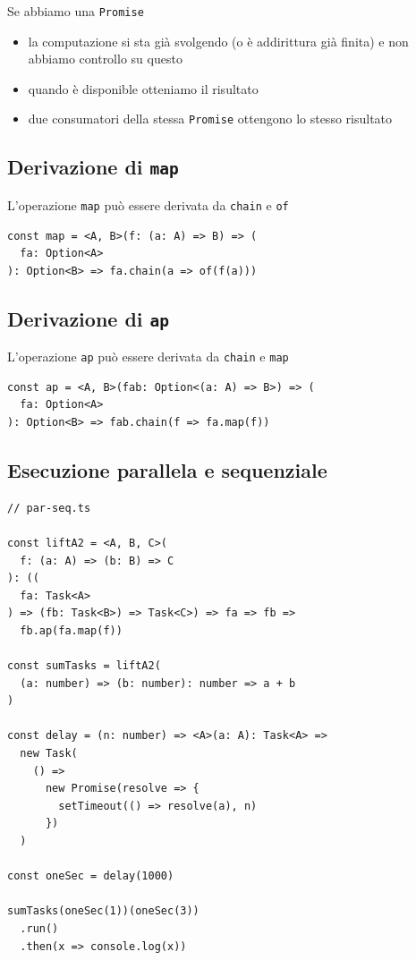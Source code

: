 \documentclass[12pt]{article}
\begin{document}
Se abbiamo una \texttt{Promise}

\begin{itemize}
  \item la computazione si sta già svolgendo (o è addirittura già finita) e non abbiamo controllo su questo
  \item quando è disponible otteniamo il risultato
  \item due consumatori della stessa \texttt{Promise} ottengono lo stesso risultato
\end{itemize}

\subsection{Derivazione di \texttt{map}}

L'operazione \texttt{map} può essere derivata da \texttt{chain} e \texttt{of}

\begin{verbatim}
const map = <A, B>(f: (a: A) => B) => (
  fa: Option<A>
): Option<B> => fa.chain(a => of(f(a)))
\end{verbatim}

\subsection{Derivazione di \texttt{ap}}

L'operazione \texttt{ap} può essere derivata da \texttt{chain} e \texttt{map}

\begin{verbatim}
const ap = <A, B>(fab: Option<(a: A) => B>) => (
  fa: Option<A>
): Option<B> => fab.chain(f => fa.map(f))
\end{verbatim}

\subsection{Esecuzione parallela e sequenziale}

\begin{verbatim}
// par-seq.ts

const liftA2 = <A, B, C>(
  f: (a: A) => (b: B) => C
): ((
  fa: Task<A>
) => (fb: Task<B>) => Task<C>) => fa => fb =>
  fb.ap(fa.map(f))

const sumTasks = liftA2(
  (a: number) => (b: number): number => a + b
)

const delay = (n: number) => <A>(a: A): Task<A> =>
  new Task(
    () =>
      new Promise(resolve => {
        setTimeout(() => resolve(a), n)
      })
  )

const oneSec = delay(1000)

sumTasks(oneSec(1))(oneSec(3))
  .run()
  .then(x => console.log(x))
\end{verbatim}
\end{document}
